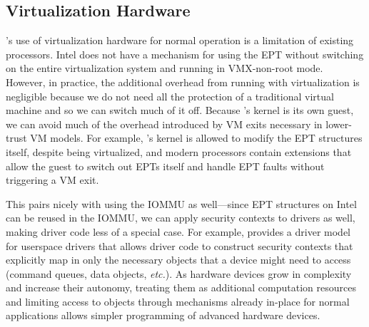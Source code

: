 \subsection{Virtualization Hardware}
\Twizzler's use of virtualization hardware for normal operation is a limitation of existing
processors. Intel does not have a mechanism for using the EPT without switching on the entire
virtualization system and running in VMX-non-root mode. However, in practice, the additional
overhead from running with virtualization is negligible because we do not need all the protection of
a traditional virtual machine and so we can switch much of it off. Because \Twizzler's kernel is its own
guest, we can avoid much of the overhead introduced by VM exits necessary in lower-trust VM models.
For example, \Twizzler's kernel is allowed to modify the EPT structures itself, despite being
virtualized, and modern processors contain extensions that allow the guest to switch out EPTs itself
and handle EPT faults without triggering a VM exit.

This pairs nicely with using the IOMMU as well---since EPT structures on Intel can be reused in the
IOMMU, we can apply security contexts to drivers as well, making driver code less of a special case.
For example, \Twizzler provides a driver model for userspace drivers that allows driver code to
construct security contexts that explicitly map in only the necessary objects that a device might
need to access (\eg command queues, data objects, \emph{etc.}). As hardware devices grow in complexity and
increase their autonomy, treating them as additional computation resources and limiting access to
objects through mechanisms already in-place for normal applications allows simpler programming of
advanced hardware devices.





